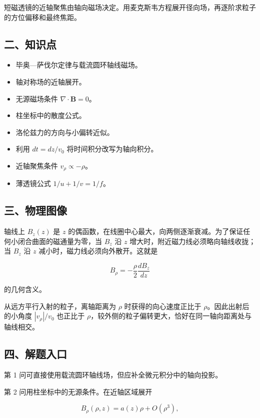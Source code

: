 \documentclass[12pt,a4paper,UTF8]{ctexart}
\newcommand{\tightlist}{\setlength{\itemsep}{0pt}\setlength{\parskip}{0pt}}
\begin{document}
短磁透镜的近轴聚焦由轴向磁场决定。用麦克斯韦方程展开径向场，再逐阶求粒子的方位偏移和最终焦距。

\subsection{二、知识点}\label{ux4e8cux77e5ux8bc6ux70b9-4}

\begin{itemize}
\tightlist
\item
  毕奥---萨伐尔定律与载流圆环轴线磁场。
\item
  轴对称场的近轴展开。
\item
  无源磁场条件 \(\nabla\cdot\bm B=0\)。
\item
  柱坐标中的散度公式。
\item
  洛伦兹力的方向与小偏转近似。
\item
  利用 \(dt=dz/v_0\) 将时间积分改写为轴向积分。
\item
  近轴聚焦条件 \(v_\rho\propto-\rho\)。
\item
  薄透镜公式 \(1/u+1/v=1/f\)。
\end{itemize}

\subsection{三、物理图像}\label{ux4e09ux7269ux7406ux56feux50cf-4}

轴线上 \(B_z(z)\) 是 \(z\)
的偶函数，在线圈中心最大，向两侧逐渐衰减。为了保证任何小闭合曲面的磁通量为零，当
\(B_z\) 沿 \(z\) 增大时，附近磁力线必须略向轴线收拢；当 \(B_z\) 沿 \(z\)
减小时，磁力线必须向外散开。这就是

\[B_\rho=-\frac{\rho}{2}\frac{dB_z}{dz}\]

的几何含义。

从远方平行入射的粒子，离轴距离为 \(\rho\) 时获得的向心速度正比于
\(\rho\)。因此出射后的小角度 \(|v_\rho|/v_0\) 也正比于
\(\rho\)，较外侧的粒子偏转更大，恰好在同一轴向距离处与轴线相交。

\subsection{四、解题入口}\label{ux56dbux89e3ux9898ux5165ux53e3-4}

第 1 问可直接使用载流圆环轴线场，但应补全微元积分中的轴向投影。

第 2 问用柱坐标中的无源条件。在近轴区域展开

\[
B_\rho(\rho,z)=a(z)\rho+O(\rho^3),
\]
\end{document}
